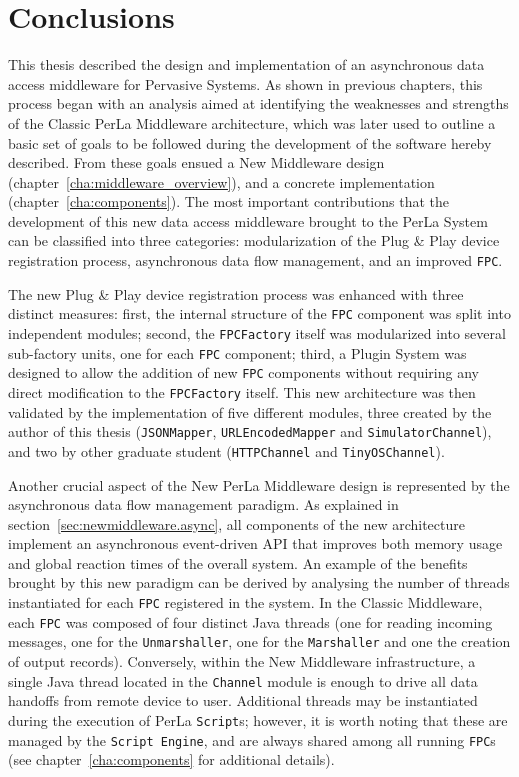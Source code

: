 \chapter{Conclusions}
\label{cha:conclusions}

This thesis described the design and implementation of an asynchronous data
access middleware for Pervasive Systems. As shown in previous chapters, this
process began with an analysis aimed at identifying the weaknesses and
strengths of the Classic PerLa Middleware architecture, which was later used to
outline a basic set of goals to be followed during the development of the
software hereby described. From these goals ensued a New Middleware design
(chapter~\ref{cha:middleware_overview}), and a concrete implementation
(chapter~\ref{cha:components}). The most important contributions that the
development of this new data access middleware brought to the PerLa System can
be classified into three categories: modularization of the Plug \& Play device
registration process, asynchronous data flow management, and an improved
\texttt{FPC}. 

The new Plug \& Play device registration process was enhanced with three
distinct measures: first, the internal structure of the \texttt{FPC} component
was split into independent modules; second, the \texttt{FPCFactory} itself was
modularized into several sub-factory units, one for each \texttt{FPC}
component; third, a Plugin System was designed to allow the addition of new
\texttt{FPC} components without requiring any direct modification to the
\texttt{FPCFactory} itself. This new architecture was then validated by the
implementation of five different modules, three created by the author of this
thesis (\texttt{JSONMapper}, \texttt{URLEncodedMapper} and
\texttt{SimulatorChannel}), and two by other graduate student
(\texttt{HTTPChannel} and \texttt{TinyOSChannel}).

Another crucial aspect of the New PerLa Middleware design is represented by the
asynchronous data flow management paradigm. As explained in
section~\ref{sec:newmiddleware.async}, all components of the new architecture
implement an asynchronous event-driven API that improves both memory usage and
global reaction times of the overall system. An example of the benefits brought
by this new paradigm can be derived by analysing the number of threads
instantiated for each \texttt{FPC} registered in the system. In the Classic
Middleware, each \texttt{FPC} was composed of four distinct Java threads (one
for reading incoming messages, one for the \texttt{Unmarshaller}, one for the
\texttt{Marshaller} and one the creation of output records). Conversely, within
the New Middleware infrastructure, a single Java thread located in the
\texttt{Channel} module is enough to drive all data handoffs from remote device
to user. Additional threads may be instantiated during the execution of PerLa
\texttt{Script}s; however, it is worth noting that these are managed by the
\texttt{Script Engine}, and are always shared among all running \texttt{FPC}s
(see chapter~\ref{cha:components} for additional details).

